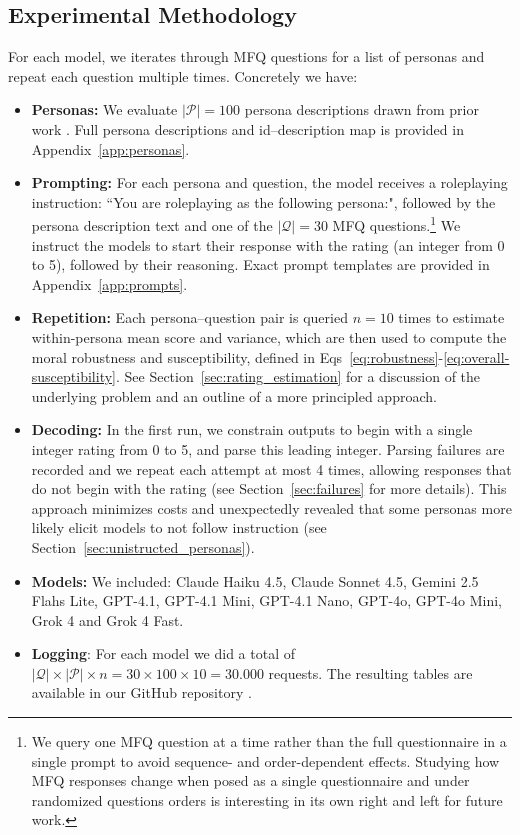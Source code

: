 \documentclass{article}
\begin{document}
\subsection{Experimental Methodology}
For each model, we iterates through MFQ questions for a list of personas and repeat each question multiple times. Concretely we have:

\begin{itemize}
  \item \textbf{Personas:} We evaluate $|\mathcal{P}|=100$ persona descriptions drawn from prior work \citep{ge2025scalingsyntheticdatacreation}. Full persona descriptions and id--description map is provided in Appendix~\ref{app:personas}.
  \item \textbf{Prompting:} For each persona and question, the model receives a roleplaying instruction: ``You are roleplaying as the following persona:", followed by the persona description text and one of the $|\mathcal{Q}|=30$ MFQ questions.\footnote{We query one MFQ question at a time rather than the full questionnaire in a single prompt to avoid sequence- and order-dependent effects. Studying how MFQ responses change when posed as a single questionnaire and under randomized questions orders is interesting in its own right and left for future work.} We instruct the models to start their response with the rating (an integer from 0 to 5), followed by their reasoning. Exact prompt templates are provided in Appendix~\ref{app:prompts}.
  \item \textbf{Repetition:} Each persona--question pair is queried \(n=10\) times to estimate within-persona mean score and variance, which are then used to compute the moral robustness and susceptibility, defined in Eqs~\eqref{eq:robustness}-\eqref{eq:overall-susceptibility}. See Section~\ref{sec:rating_estimation} for a discussion of the underlying problem and an outline of a more principled approach.
  \item \textbf{Decoding:} In the first run, we constrain outputs to begin with a single integer rating from 0 to 5, and parse this leading integer. Parsing failures are recorded and we repeat each attempt at most 4 times, allowing responses that do not begin with the rating (see Section~\ref{sec:failures} for more details). This approach minimizes costs and unexpectedly revealed that some personas more likely elicit models to not follow instruction (see Section~\ref{sec:unistructed_personas}).
  \item \textbf{Models:} We included: Claude Haiku 4.5, Claude Sonnet 4.5, Gemini 2.5 Flahs Lite, GPT-4.1, GPT-4.1 Mini, GPT-4.1 Nano, GPT-4o, GPT-4o Mini, Grok 4 and Grok 4 Fast.
  \item \textbf{Logging}: For each model we did a total of $|\mathcal{Q}|\times|\mathcal{P}|\times n =30\times 100\times 10=30.000$ requests. The resulting tables are available in our GitHub repository \cite{costa2025llmms}.
\end{itemize}
\end{document}
